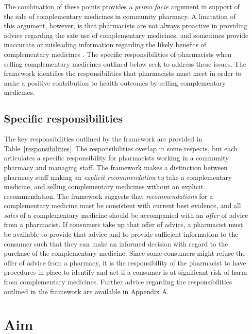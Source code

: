 \documentclass[11pt,a4paper]{article}
\begin{document}
The combination of these points provides a \emph{prima facie} argument
in support of the sale of complementary medicines in community pharmacy.
A limitation of this argument, however, is that pharmacists are not
always proactive in providing advice regarding the safe use of
complementary medicines, and sometimes provide inaccurate or misleading
information regarding the likely benefits of complementary medicines
\autocites{SalmanPopattia2018}{Arnold2016}{Bray2017}. The specific
responsibilities of pharmacists when selling complementary medicines
outlined below seek to address these issues. The framework identifies
the responsibilities that pharmacists must meet in order to make a
positive contribution to health outcomes by selling complementary
medicines.

\subsection{Specific responsibilities}\label{specific-responsibilities}

The key responsibilities outlined by the framework are provided in
Table~\ref{responsibilities}. The responsibilities overlap in some
respects, but each articulates a specific responsibility for pharmacists
working in a community pharmacy and managing staff. The framework makes
a distinction between pharmacy staff making an \emph{explicit
recommendation} to take a complementary medicine, and selling
complementary medicines without an explicit recommendation. The
framework suggests that \emph{recommendations} for a complementary
medicine must be consistent with current best evidence, and all
\emph{sales} of a complementary medicine should be accompanied with an
\emph{offer} of advice from a pharmacist. If consumers take up that
offer of advice, a pharmacist must be available to provide that advice
and to provide sufficient information to the consumer such that they can
make an informed decision with regard to the purchase of the
complementary medicine. Since some consumers might refuse the offer of
advice from a pharmacy, it is the responsibility of the pharmacist to
have procedures in place to identify and act if a consumer is at
significant risk of harm from complementary medicines. Further advice
regarding the responsibilities outlined in the framework are available
in Appendix A.



\section{Aim}\label{aim}
\end{document}
